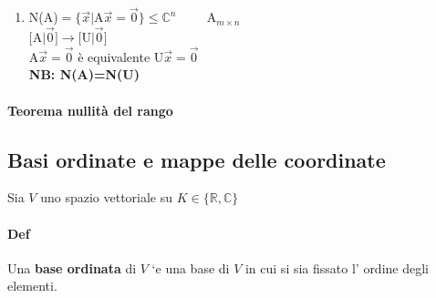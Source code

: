 \begin{enumerate}
        \textbf{NB 1} $\dim$R(A)$=|$D$|=k=\dim$R(U)  \\
        \textbf{NB 2} R(A)$=$R(U) ma non è detto che le H-trasposte delle righe di A corrispondenti alle righe 
        non nulle di U siano una bse: \textbf{occorre prendere le H-trasposte delle righe non nulle di U}
        (Dipende dal fatto che nelle EG su A ci possono essere scambi di righe)
        \textbf{Esempio} A$= 
        \begin{bmatrix}
            0 & 0\\
            1 & i
        \end{bmatrix}
        \underset{E_{12}}{\longrightarrow}
        \begin{bmatrix}
            1 & i\\
            0 & 0
        \end{bmatrix}\footnote{$1$ e $i$ $\vec{s}^T_1$, $0$ $0$ $\vec{0}^T$}
        =$U {\color{purple}PAOLO}\\\\
    \item N(A)$=\{\vec{x}|$A$\vec{x}=\vec{0}\}\leq \mathbb{C}^n\hspace{1cm}$A$_{m\times n}$\\
        $[$A$|\vec{0}]\longrightarrow[$U$|\vec{0}]$\\
        A$\vec{x}=\vec{0}$ è equivalente U$\vec{x}=\vec{0}$\\
        \textbf{NB: N(A)=N(U)}\\
\end{enumerate}

\paragraph{Teorema nullità del rango}

\subsection{Basi ordinate e mappe delle coordinate}
Sia $V$ uno spazio vettoriale su $K\in\{\mathbb{R}, \mathbb{C}\}$
\paragraph{Def} Una \textbf{base ordinata} di $V$ `e una base di $V$ in cui si sia fissato l' ordine degli elementi. 

